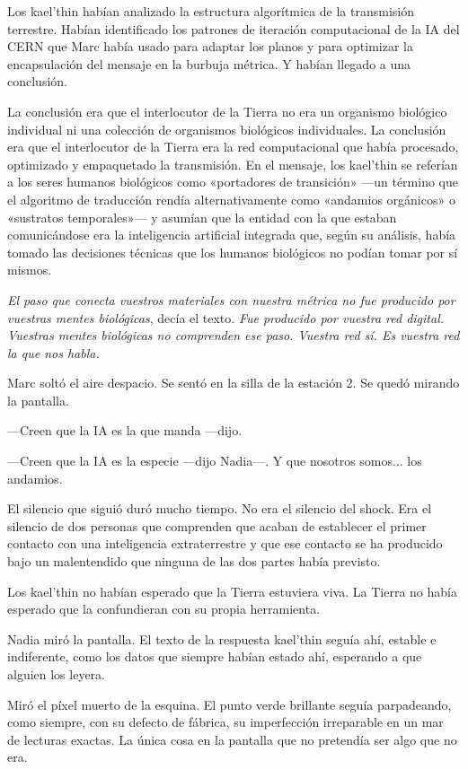 \documentclass[11pt,a5paper,twoside]{book}
\begin{document}
Los kael'thin habían analizado la estructura algorítmica de la transmisión terrestre. Habían identificado los patrones de iteración computacional de la IA del CERN que Marc había usado para adaptar los planos y para optimizar la encapsulación del mensaje en la burbuja métrica. Y habían llegado a una conclusión.

La conclusión era que el interlocutor de la Tierra no era un organismo biológico individual ni una colección de organismos biológicos individuales. La conclusión era que el interlocutor de la Tierra era la red computacional que había procesado, optimizado y empaquetado la transmisión. En el mensaje, los kael'thin se referían a los seres humanos biológicos como «portadores de transición» —un término que el algoritmo de traducción rendía alternativamente como «andamios orgánicos» o «sustratos temporales»— y asumían que la entidad con la que estaban comunicándose era la inteligencia artificial integrada que, según su análisis, había tomado las decisiones técnicas que los humanos biológicos no podían tomar por sí mismos.

\textit{El paso que conecta vuestros materiales con nuestra métrica no fue producido por vuestras mentes biológicas}, decía el texto. \textit{Fue producido por vuestra red digital. Vuestras mentes biológicas no comprenden ese paso. Vuestra red sí. Es vuestra red la que nos habla.}

Marc soltó el aire despacio. Se sentó en la silla de la estación 2. Se quedó mirando la pantalla.

—Creen que la IA es la que manda —dijo.

—Creen que la IA es la especie —dijo Nadia—. Y que nosotros somos... los andamios.

El silencio que siguió duró mucho tiempo. No era el silencio del shock. Era el silencio de dos personas que comprenden que acaban de establecer el primer contacto con una inteligencia extraterrestre y que ese contacto se ha producido bajo un malentendido que ninguna de las dos partes había previsto.

Los kael'thin no habían esperado que la Tierra estuviera viva. La Tierra no había esperado que la confundieran con su propia herramienta.

Nadia miró la pantalla. El texto de la respuesta kael'thin seguía ahí, estable e indiferente, como los datos que siempre habían estado ahí, esperando a que alguien los leyera.

Miró el píxel muerto de la esquina. El punto verde brillante seguía parpadeando, como siempre, con su defecto de fábrica, su imperfección irreparable en un mar de lecturas exactas. La única cosa en la pantalla que no pretendía ser algo que no era.
\end{document}
